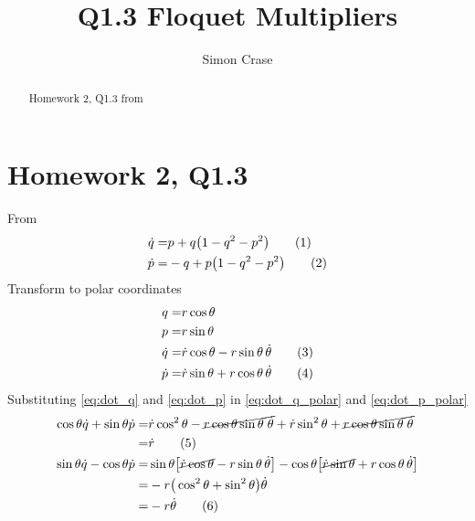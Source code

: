\documentclass[]{article}
\title{Q1.3 Floquet Multipliers}
\author{Simon Crase}
\newcommand\numberthis{\addtocounter{equation}{1}\tag{\theequation}}
\begin{document}
\maketitle

\begin{abstract}
Homework 2, Q1.3 from \cite{ChaosBook}
\end{abstract}

\section{Homework 2, Q1.3}

From \cite[Q1.3]{ChaosBook}
\begin{align*}
	\dot{q} =& p + q\big(1-q^2-p^2\big) \numberthis \label{eq:dot_q}\\
	\dot{p} =&-q + p\big(1-q^2-p^2\big) \numberthis \label{eq:dot_p}
\end{align*}
Transform to polar coordinates
\begin{align*}
	q =& r \cos{\theta}\\
	p =& r \sin{\theta}\\
	\dot{q} =& \dot{r} \cos{\theta}  - r \sin{\theta} \, \dot{\theta} \numberthis \label{eq:dot_q_polar}\\
	\dot{p} =& \dot{r} \sin{\theta}  + r \cos{\theta} \, \dot{\theta} \numberthis \label{eq:dot_p_polar}
\end{align*}
Substituting \eqref{eq:dot_q} and \eqref{eq:dot_p} in \eqref{eq:dot_q_polar} and \eqref{eq:dot_p_polar}
\begin{align*}
	\cos{\theta} \dot{q} + \sin{\theta} \dot{p} =& \dot{r}\cos^2\theta -\cancel{r \cos{\theta} \sin{\theta}\; \dot{\theta}} + \dot{r}\sin^2\theta+ \cancel{r \cos{\theta} \sin{\theta}\; \dot{\theta}}\\
	=& \dot{r}  \numberthis \label{eq:dot_r0}\\
	\sin{\theta} \dot{q} - \cos{\theta}\dot{p} =& \sin{\theta} \big[\cancel{\dot{r} \cos{\theta}}  - r \sin{\theta} \, \dot{\theta}\big] - \cos{\theta}\big[\cancel{\dot{r} \sin{\theta}}  + r \cos{\theta} \, \dot{\theta}\big]\\
	=& - r \big(\cos^2\theta+\sin^2\theta\big) \dot{\theta}\\
	=&-r \dot{\theta} \numberthis \label{eq:dot_theta}
\end{align*}
\end{document}
